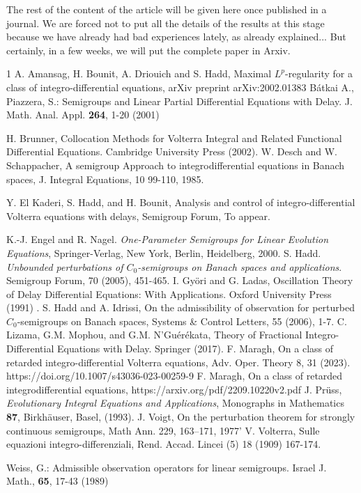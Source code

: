 \documentclass[12pt]{amsart}
\theoremstyle{definition}
\theoremstyle{remark}
\theoremstyle{example}
\begin{document}
\newpage

{\Huge The rest of the content of the article will be given here once published in a journal. We are forced not to put all the details of the results at this stage because we have already had bad experiences lately, as already explained... But certainly, in a few weeks, we will put the complete paper in Arxiv. }

\begin{thebibliography}{1}
A. Amansag, H. Bounit, A. Driouich and S. Hadd, Maximal $L^p$-regularity for a class of integro-differential equations,
arXiv preprint arXiv:2002.01383
  B\'{a}tkai A., Piazzera, S.: Semigroups and Linear Partial Differential Equations with Delay. J. Math. Anal. Appl.
\textbf{264}, 1-20 (2001)

H. Brunner, Collocation Methods for Volterra Integral and Related Functional Differential Equations. Cambridge University Press (2002).
 W. Desch and W. Schappacher, A semigroup Approach to integrodifferential equations in Banach spaces, J. Integral Equations, 10 99-110, 1985.

     Y. El Kaderi, S. Hadd, and H. Bounit, Analysis and control of integro-differential Volterra equations with delays, Semigroup Forum, To appear.

 K.-J. Engel and R. Nagel. \textit{One-Parameter Semigroups for Linear Evolution Equations}, Springer-Verlag, New York, Berlin, Heidelberg, 2000.
 S. Hadd. \emph{Unbounded perturbations of $C_0$-semigroups on Banach spaces and applications}. Semigroup Forum, 70 (2005), 451-465.
    I. Gy\"ori and G. Ladas, Oscillation Theory of Delay Differential Equations: With Applications. Oxford University Press (1991) .
  S. Hadd and A. Idrissi, On the admissibility of observation for perturbed $C_0$-semigroups on
Banach spaces, Systems \& Control Letters, 55 (2006), 1-7.
C. Lizama, G.M. Mophou, and G.M. N'Guérékata, Theory of Fractional Integro-Differential Equations with Delay. Springer (2017).
 F. Maragh, On a class of retarded integro-differential Volterra equations,  Adv. Oper. Theory 8, 31 (2023). https://doi.org/10.1007/s43036-023-00259-9
 F. Maragh,   On a class of retarded integrodifferential equations, https://arxiv.org/pdf/2209.10220v2.pdf
 J. Pr\"uss, \textit{Evolutionary Integral Equations and Applications}, Monographs in Mathematics \textbf{87}, Birkh\"auser, Basel, (1993).
 J. Voigt, On the perturbation theorem for strongly continuous semigroups, Math Ann. 229, 163--171, 1977'
    V. Volterra, Sulle equazioni integro-differenziali, Rend. Accad. Lincei (5) 18 (1909) 167-174.

Weiss, G.: Admissible observation operators for linear semigroups.  Israel J. Math., \textbf{65},  17-43 (1989)
\end{thebibliography}
\end{document}
